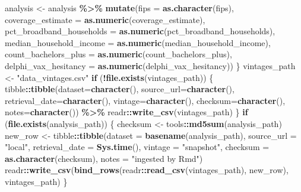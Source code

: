 \documentclass[
  11pt,
]{article}
\newenvironment{Shaded}{\begin{snugshade}}{\end{snugshade}}
\newcommand{\AttributeTok}[1]{\textcolor[rgb]{0.13,0.29,0.53}{#1}}
\newcommand{\ControlFlowTok}[1]{\textcolor[rgb]{0.13,0.29,0.53}{\textbf{#1}}}
\newcommand{\FunctionTok}[1]{\textcolor[rgb]{0.13,0.29,0.53}{\textbf{#1}}}
\newcommand{\NormalTok}[1]{#1}
\newcommand{\OtherTok}[1]{\textcolor[rgb]{0.56,0.35,0.01}{#1}}
\newcommand{\SpecialCharTok}[1]{\textcolor[rgb]{0.81,0.36,0.00}{\textbf{#1}}}
\newcommand{\StringTok}[1]{\textcolor[rgb]{0.31,0.60,0.02}{#1}}
\begin{document}
\begin{Shaded}
\begin{Highlighting}[]
\NormalTok{  analysis }\OtherTok{\textless{}{-}}\NormalTok{ analysis }\SpecialCharTok{\%\textgreater{}\%}
    \FunctionTok{mutate}\NormalTok{(}\AttributeTok{fips =} \FunctionTok{as.character}\NormalTok{(fips),}
           \AttributeTok{coverage\_estimate =} \FunctionTok{as.numeric}\NormalTok{(coverage\_estimate),}
           \AttributeTok{pct\_broadband\_households =} \FunctionTok{as.numeric}\NormalTok{(pct\_broadband\_households),}
           \AttributeTok{median\_household\_income =} \FunctionTok{as.numeric}\NormalTok{(median\_household\_income),}
           \AttributeTok{count\_bachelors\_plus =} \FunctionTok{as.numeric}\NormalTok{(count\_bachelors\_plus),}
           \AttributeTok{delphi\_vax\_hesitancy =} \FunctionTok{as.numeric}\NormalTok{(delphi\_vax\_hesitancy))}
\NormalTok{\}}
\NormalTok{vintages\_path }\OtherTok{\textless{}{-}} \StringTok{"data\_vintages.csv"}
\ControlFlowTok{if}\NormalTok{ (}\SpecialCharTok{!}\FunctionTok{file.exists}\NormalTok{(vintages\_path)) \{}
\NormalTok{  tibble}\SpecialCharTok{::}\FunctionTok{tibble}\NormalTok{(}\AttributeTok{dataset=}\FunctionTok{character}\NormalTok{(), }\AttributeTok{source\_url=}\FunctionTok{character}\NormalTok{(), }\AttributeTok{retrieval\_date=}\FunctionTok{character}\NormalTok{(), }\AttributeTok{vintage=}\FunctionTok{character}\NormalTok{(), }\AttributeTok{checksum=}\FunctionTok{character}\NormalTok{(), }\AttributeTok{notes=}\FunctionTok{character}\NormalTok{()) }\SpecialCharTok{\%\textgreater{}\%}\NormalTok{ readr}\SpecialCharTok{::}\FunctionTok{write\_csv}\NormalTok{(vintages\_path)}
\NormalTok{\}}
\ControlFlowTok{if}\NormalTok{ (}\FunctionTok{file.exists}\NormalTok{(analysis\_path)) \{}
\NormalTok{  checksum }\OtherTok{\textless{}{-}}\NormalTok{ tools}\SpecialCharTok{::}\FunctionTok{md5sum}\NormalTok{(analysis\_path)}
\NormalTok{  new\_row }\OtherTok{\textless{}{-}}\NormalTok{ tibble}\SpecialCharTok{::}\FunctionTok{tibble}\NormalTok{(}\AttributeTok{dataset =} \FunctionTok{basename}\NormalTok{(analysis\_path), }\AttributeTok{source\_url =} \StringTok{"local"}\NormalTok{, }\AttributeTok{retrieval\_date =} \FunctionTok{Sys.time}\NormalTok{(), }\AttributeTok{vintage =} \StringTok{"snapshot"}\NormalTok{, }\AttributeTok{checksum =} \FunctionTok{as.character}\NormalTok{(checksum), }\AttributeTok{notes =} \StringTok{"ingested by Rmd"}\NormalTok{)}
\NormalTok{  readr}\SpecialCharTok{::}\FunctionTok{write\_csv}\NormalTok{(}\FunctionTok{bind\_rows}\NormalTok{(readr}\SpecialCharTok{::}\FunctionTok{read\_csv}\NormalTok{(vintages\_path), new\_row), vintages\_path)}
\NormalTok{\}}
\end{Highlighting}
\end{Shaded}
\end{document}
